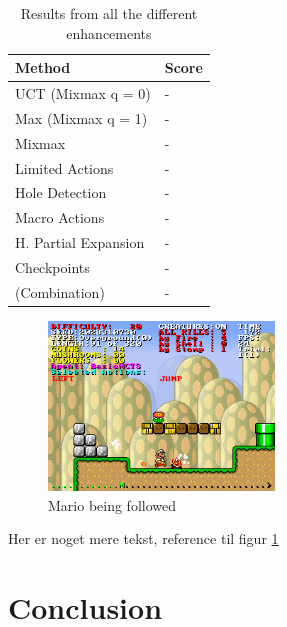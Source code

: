\documentclass[10pt,a4paper]{article}
\begin{document}
\begin{table}[h]
	\centering
	\begin{tabular}{| l | l |}
		\hline
		\textbf{Method} & \textbf{Score} \\ \hline
		UCT (Mixmax q = 0)				& - \\ \hline
		Max (Mixmax q = 1)				& - \\ \hline
		Mixmax							& - \\ \hline
		Limited Actions		 			& - \\ \hline
		Hole Detection		 			& - \\ \hline
		Macro Actions		 			& - \\ \hline
		H. Partial Expansion			& - \\ \hline
		Checkpoints						& - \\ \hline
		(Combination)					& - \\ \hline
	\end{tabular}
	\caption{Results from all the different enhancements}
	\label{tab:method_results}
\end{table}


\begin{figure}[h]
\centering
\includegraphics[width=6cm]{Forfulgt.png}
\caption{Mario being followed}
\label{fig:followed}
\end{figure}

Her er noget mere tekst, reference til figur \ref{fig:followed}
\clearpage
\section{Conclusion}
\clearpage
\end{document}
